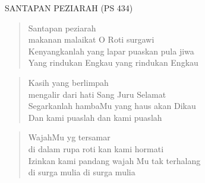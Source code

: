 \begin{center}
SANTAPAN PEZIARAH (PS 434) 
\end{center} 

\begin{verse}
Santapan peziarah\\ 
makanan malaikat O Roti surgawi \\
Kenyangkanlah yang lapar puaskan pula jiwa \\
Yang rindukan Engkau yang rindukan Engkau 
\end{verse}

\begin{verse} 
Kasih yang berlimpah \\
mengalir dari hati Sang Juru Selamat \\
Segarkanlah hambaMu yang haus akan Dikau \\
Dan kami puaslah dan kami puaslah 
\end{verse}

\begin{verse} 
WajahMu yg tersamar\\
di dalam rupa roti kan kami hormati \\
Izinkan kami pandang wajah Mu tak terhalang\\ 
di surga mulia di surga mulia
\end{verse}

